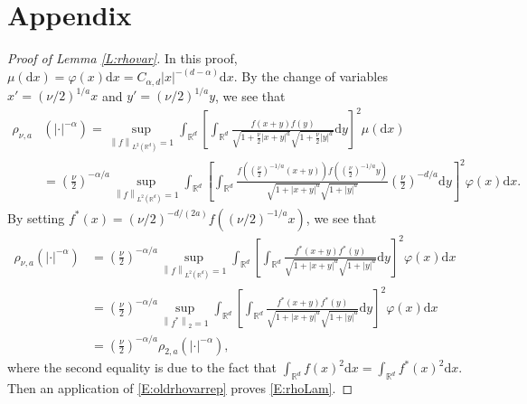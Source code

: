 \documentclass[a4paper,11pt]{article}
\numberwithin{equation}{section}
\numberwithin{equation}{section}
\theoremstyle{plain}
\theoremstyle{definition}
\newcommand{\ud}{\ensuremath{\mathrm{d} }}
\newcommand{\Norm}[1]{\left\|  #1   \right\|}
\newcommand{\R}{\mathbb{R}}
\begin{document}
\section{Appendix} \label{S:Appendix}

\begin{proof}[Proof of Lemma \ref{L:rhovar}]
  In this proof, $\mu(\ud x) = \varphi(x)\ud x = C_{\alpha,d}|x|^{-(d-\alpha)}\ud x$. By the change of
  variables $x' = \left(\nu/2\right)^{1/a} x$ and $y' = \left(\nu/2\right)^{1/a} y$, we see that
  \begin{align*}
    \rho_{\nu,a}
    & \left(|\cdot|^{-\alpha}\right) = \sup_{\Norm{f}_{L^2(\R^d)} =1} \int_{\R^d} \left[ \int_{\R^d} \frac{f(x+y)f(y)}{\sqrt{1+\frac{\nu}{2}|x+y|^a } \sqrt{1+\frac{\nu}{2}|y|^a} } \ud y \right]^2 \mu(\ud x) \\
    & = \left( \frac{\nu}{2} \right)^{-\alpha/a} \sup_{\Norm{f}_{L^2(\R^d)} =1} \int_{\R^d} \left[ \int_{\R^d} \frac{f\left(\left(\frac{\nu}{2}\right)^{-1/a}(x+y)\right)f\left(\left(\frac{\nu}{2}\right)^{-1/a}y\right)}{\sqrt{1+|x+y|^a } \sqrt{1+|y|^a} } \left(\frac{\nu}{2}\right)^{-d/a} \ud y \right]^2 \varphi(x)\ud x.
  \end{align*}
  By setting $f^*(x) =\left(\nu/2\right)^{-d/(2a)} f\left( \left(\nu/2\right)^{-1/a} x \right)$, we see that
  \begin{align*}
    \rho_{\nu,a} \left(|\cdot|^{-\alpha}\right)
    & = \left( \frac{\nu}{2} \right)^{-\alpha/a} \sup_{\Norm{f}_{L^2(\R^d)} =1} \int_{\R^d} \left[ \int_{\R^d} \frac{f^*\left(x+y\right)f^*\left(y\right)}{\sqrt{1+|x+y|^a } \sqrt{1+|y|^a} }  \ud y \right]^2 \varphi(x)\ud x \\
    & = \left( \frac{\nu}{2} \right)^{-\alpha/a}  \sup_{\Norm{f^*}_2 =1}  \int_{\R^d} \left[ \int_{\R^d} \frac{f^*\left(x+y\right)f^*\left(y\right)}{\sqrt{1+|x+y|^a } \sqrt{1+|y|^a} }  \ud y \right]^2 \varphi(x)\ud x       \\
    & = \left( \frac{\nu}{2} \right)^{-\alpha/a}  \rho_{2,a}\left(|\cdot|^{-\alpha}\right),
  \end{align*}
  where the second equality is due to the fact that $\int_{\R^d} f(x)^2 \ud x = \int_{\R^d} f^*(x)^2
  \ud x$.  Then an application of \eqref{E:oldrhovarrep} proves \eqref{E:rhoLam}.


\end{proof}
\end{document}
